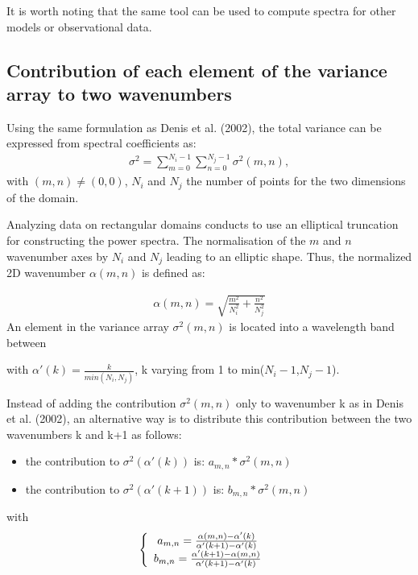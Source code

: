 It is worth noting that the same tool can be used to compute spectra for other models or observational data. 


\subsection*{Contribution of each element of the variance array to two wavenumbers}

Using the same formulation as Denis et al. (2002), the total variance can be expressed from spectral coefficients as: 
\begin{eqnarray*}
 \sigma^{2}=\sum_{m=0 }^{N_{i}-1}\sum_{n=0}^{N_{j}-1} \sigma^{2}(m,n), 
\end{eqnarray*}
with $(m,n)\neq(0,0)$, $N_{i}$ and $N_{j}$ the number of points for the two dimensions of the domain. 

Analyzing data on rectangular domains conducts to use an elliptical truncation for constructing the power spectra. The normalisation of the $m$ and $n$ wavenumber axes by $N_{i}$ and $N_{j}$ leading to an elliptic shape. Thus, the normalized 2D wavenumber $\alpha(m,n)$ is defined as:

\begin{eqnarray*}
\alpha(m,n) = \sqrt{\frac{m^2}{N_{i}^2}+ \frac{n^2}{N_{j}^2}}
\end{eqnarray*}
An element in the variance array $\sigma^2(m,n)$ is located into a wavelength band between

with $\alpha'(k)=\frac{k}{min(N_{i},N_{j})}$, k varying from 1 to min($N_{i}-1$,$N_{j}-1$).

Instead of adding the contribution $\sigma^2(m,n)$ only to wavenumber k as in Denis et al. (2002), an alternative way is to distribute this contribution between the two wavenumbers k and k+1 as follows:

\begin{itemize}
 \item the contribution to $\sigma^2(\alpha'(k))$ is: $a_{m,n} * \sigma^2(m,n)$
 \item the contribution to $\sigma^2(\alpha'(k+1))$ is: $b_{m,n} * \sigma^2(m,n)$
\end{itemize}



with 
\begin{eqnarray*}
\left\lbrace
\begin{array}{c c}
a_{m,n}=\frac{\alpha(m,n)-\alpha'(k)}{\alpha'(k+1)-\alpha'(k)} & \\
b_{m,n}=\frac{\alpha'(k+1)-\alpha(m,n)}{\alpha'(k+1)-\alpha'(k)} & \\
\end{array} 
\right.
\end{eqnarray*}

